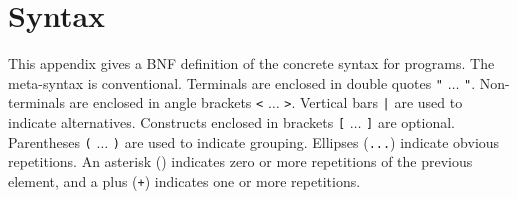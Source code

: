 
\chapter{Syntax}
\label{chap:syntax}

This appendix gives a BNF definition of the concrete syntax for \caph programs.  The meta-syntax is
conventional.  Terminals are enclosed in double quotes {\tt "} $\ldots$ {\tt "}.  Non-terminals are
enclosed in angle brackets {\tt <} $\ldots$ {\tt >}.  Vertical bars {\tt |} are used to indicate
alternatives.  Constructs enclosed in brackets {\tt [} $\ldots$ {\tt ]} are optional.  Parentheses
{\tt (} $\ldots$ {\tt )} are used to indicate grouping.  Ellipses ({\tt ...}) indicate obvious
repetitions.  An asterisk ({\tt *}) indicates zero or more repetitions of the previous element, and
a plus ({\tt +}) indicates one or more repetitions.


